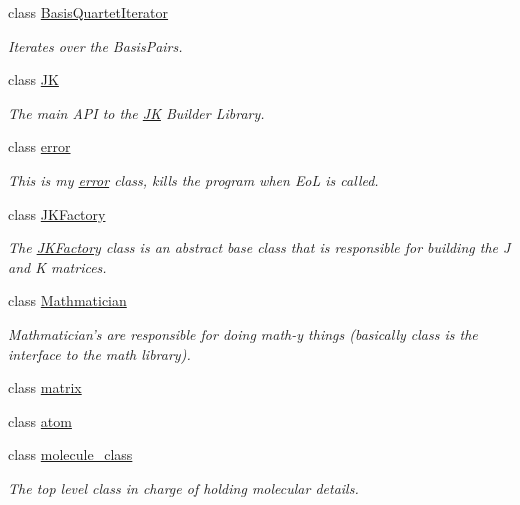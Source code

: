 \begin{DoxyCompactItemize}
class \hyperlink{classJKBuilder_1_1BasisQuartetIterator}{BasisQuartetIterator}
\begin{DoxyCompactList}\small\item\em Iterates over the BasisPairs. \item\end{DoxyCompactList}\item 
class \hyperlink{classJKBuilder_1_1JK}{JK}
\begin{DoxyCompactList}\small\item\em The main API to the \hyperlink{classJKBuilder_1_1JK}{JK} Builder Library. \item\end{DoxyCompactList}\item 
class \hyperlink{classJKBuilder_1_1error}{error}
\begin{DoxyCompactList}\small\item\em This is my \hyperlink{classJKBuilder_1_1error}{error} class, kills the program when EoL is called. \item\end{DoxyCompactList}\item 
class \hyperlink{classJKBuilder_1_1JKFactory}{JKFactory}
\begin{DoxyCompactList}\small\item\em The \hyperlink{classJKBuilder_1_1JKFactory}{JKFactory} class is an abstract base class that is responsible for building the J and K matrices. \item\end{DoxyCompactList}\item 
class \hyperlink{classJKBuilder_1_1Mathmatician}{Mathmatician}
\begin{DoxyCompactList}\small\item\em Mathmatician's are responsible for doing math-\/y things (basically class is the interface to the math library). \item\end{DoxyCompactList}\item 
class \hyperlink{classJKBuilder_1_1matrix}{matrix}
\item 
class \hyperlink{classJKBuilder_1_1atom}{atom}
\item 
class \hyperlink{classJKBuilder_1_1molecule__class}{molecule\_\-class}
\begin{DoxyCompactList}\small\item\em The top level class in charge of holding molecular details. \item\end{DoxyCompactList}\item 

\end{DoxyCompactItemize}
